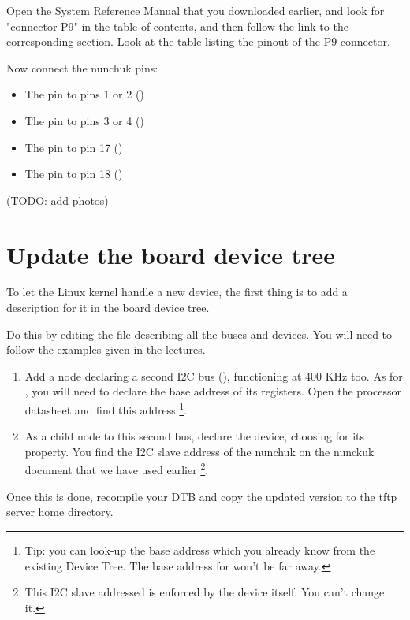 Open the System Reference Manual that you downloaded earlier,
and look for "connector P9" in the table of contents, and then
follow the link to the corresponding section. Look at the table listing
the pinout of the P9 connector.

Now connect the nunchuk pins:
\begin{itemize}
\item The  pin to pins 1 or 2 ()
\item The  pin to pins 3 or 4 ()
\item The  pin to pin 17 ()
\item The  pin to pin 18 ()
\end{itemize}

(TODO: add photos)

\section{Update the board device tree}

To let the Linux kernel handle a new device, the first thing is to add a
description for it in the board device tree.

Do this by editing the 
file describing all the buses and devices. You will need to follow the
examples given in the lectures.

\begin{enumerate}
\item Add a node declaring a second I2C bus (), functioning
      at 400 KHz too. As for , you will need to declare
      the base address of its registers. Open the processor datasheet
      and find this address
      \footnote{Tip: you can look-up the  base address which
      you already know from the existing Device Tree. The base address
      for  won't be far away.}.
\item As a child node to this second bus, declare the 
      device, choosing  for its 
      property. You find the I2C slave address of the nunchuk on
      the nunckuk document that we have used earlier
      \footnote{This I2C slave addressed is enforced by the device
      itself. You can't change it.}.
\end{enumerate}

Once this is done, recompile your DTB and copy the updated version to
the tftp server home directory.

